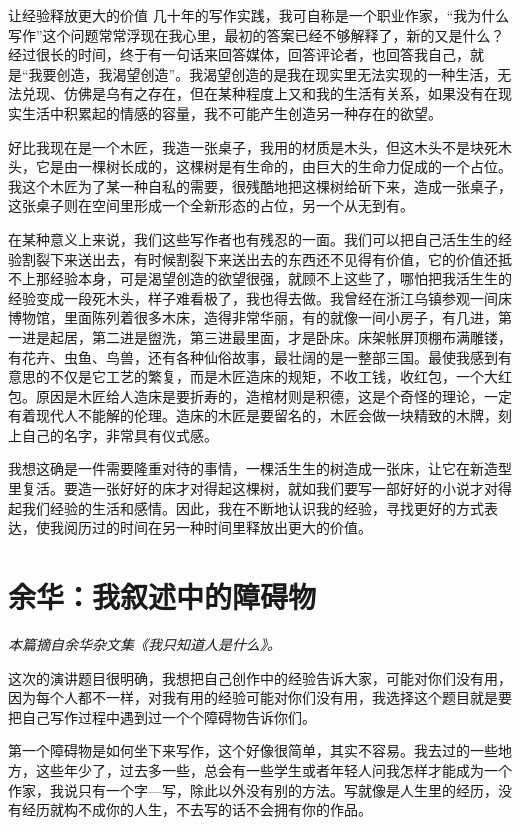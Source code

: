 \documentclass[fontset=fandol,12pt,a5paper]{ctexbook}
\begin{document}
让经验释放更大的价值
几十年的写作实践，我可自称是一个职业作家，“我为什么写作”这个问题常常浮现在我心里，最初的答案已经不够解释了，新的又是什么？经过很长的时间，终于有一句话来回答媒体，回答评论者，也回答我自己，就是“我要创造，我渴望创造”。我渴望创造的是我在现实里无法实现的一种生活，无法兑现、仿佛是乌有之存在，但在某种程度上又和我的生活有关系，如果没有在现实生活中积累起的情感的容量，我不可能产生创造另一种存在的欲望。

好比我现在是一个木匠，我造一张桌子，我用的材质是木头，但这木头不是块死木头，它是由一棵树长成的，这棵树是有生命的，由巨大的生命力促成的一个占位。我这个木匠为了某一种自私的需要，很残酷地把这棵树给斫下来，造成一张桌子，这张桌子则在空间里形成一个全新形态的占位，另一个从无到有。

在某种意义上来说，我们这些写作者也有残忍的一面。我们可以把自己活生生的经验割裂下来送出去，有时候割裂下来送出去的东西还不见得有价值，它的价值还抵不上那经验本身，可是渴望创造的欲望很强，就顾不上这些了，哪怕把我活生生的经验变成一段死木头，样子难看极了，我也得去做。我曾经在浙江乌镇参观一间床博物馆，里面陈列着很多木床，造得非常华丽，有的就像一间小房子，有几进，第一进是起居，第二进是盥洗，第三进最里面，才是卧床。床架帐屏顶棚布满雕镂，有花卉、虫鱼、鸟兽，还有各种仙俗故事，最壮阔的是一整部三国。最使我感到有意思的不仅是它工艺的繁复，而是木匠造床的规矩，不收工钱，收红包，一个大红包。原因是木匠给人造床是要折寿的，造棺材则是积德，这是个奇怪的理论，一定有着现代人不能解的伦理。造床的木匠是要留名的，木匠会做一块精致的木牌，刻上自己的名字，非常具有仪式感。

我想这确是一件需要隆重对待的事情，一棵活生生的树造成一张床，让它在新造型里复活。要造一张好好的床才对得起这棵树，就如我们要写一部好好的小说才对得起我们经验的生活和感情。因此，我在不断地认识我的经验，寻找更好的方式表达，使我阅历过的时间在另一种时间里释放出更大的价值。


\newpage

\section{余华：我叙述中的障碍物}

\emph{本篇摘自余华杂文集《我只知道人是什么》。}
\vspace{2em}

这次的演讲题目很明确，我想把自己创作中的经验告诉大家，可能对你们没有用，因为每个人都不一样，对我有用的经验可能对你们没有用，我选择这个题目就是要把自己写作过程中遇到过一个个障碍物告诉你们。

第一个障碍物是如何坐下来写作，这个好像很简单，其实不容易。我去过的一些地方，这些年少了，过去多一些，总会有一些学生或者年轻人问我怎样才能成为一个作家，我说只有一个字—写，除此以外没有别的方法。写就像是人生里的经历，没有经历就构不成你的人生，不去写的话不会拥有你的作品。
\end{document}
